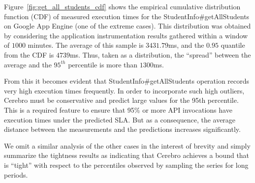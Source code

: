 Figure~\ref{fig:get_all_students_cdf} shows the empirical cumulative
distribution function (CDF) of measured execution times for the 
StudentInfo\#getAllStudents on
Google App Engine (one of the extreme cases). 
This distribution was obtained by considering the application instrumentation 
results gathered within a window of $1000$ minutes. 
The average of this sample is $3431.79$ms, and the $0.95$ quantile
from the CDF is $4739$ms.  Thus, taken as a distribution, the ``spread''
between the average and the $95^{th}$ percentile is more
than $1300$ms.  



From this it becomes evident that StudentInfo\#getAllStudents operation records very high execution times frequently. 
In order to incorporate such high outliers, Cerebro must be conservative and predict large values for
the 95th percentile. This is a required feature to ensure that 95\% or more API invocations have
execution times under the predicted SLA. But as a consequence, the average distance between the 
measurements and the predictions increases significantly.

We omit a similar analysis of the other cases in the interest of brevity and
simply summarize the tightness results as indicating that Cerebro achieves a
bound that is ``tight'' with respect to the percentiles observed by sampling
the series for long periods.

